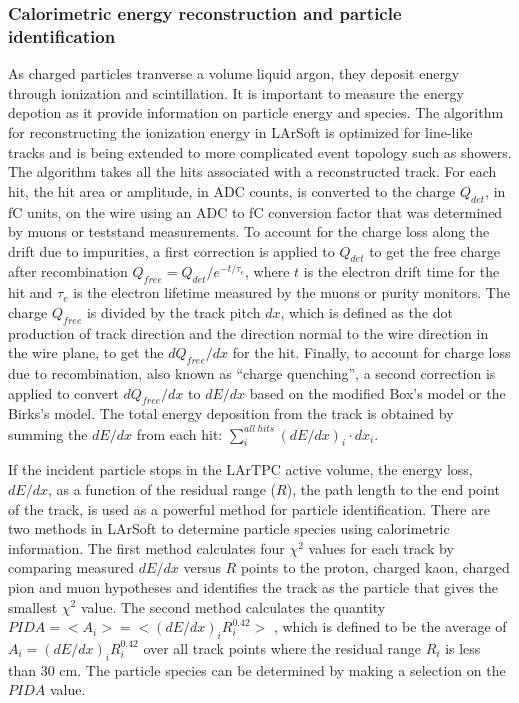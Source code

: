 \documentclass[12pt]{elsarticle}
\begin{document}
\subsubsection{Calorimetric energy reconstruction and particle identification}
As charged particles tranverse a volume liquid argon, they deposit energy through ionization and scintillation. It is important to measure the energy depotion as it provide information on particle energy and species. The algorithm for reconstructing the ionization energy in LArSoft is optimized for line-like tracks and is being extended to more complicated event topology such as showers. The algorithm takes all the hits associated with a reconstructed track. For each hit, the hit area or amplitude, in ADC counts, is converted to the charge $Q_{det}$, in fC units, on the wire using an ADC to fC conversion factor that was determined by muons or teststand measurements. To account for the charge loss along the drift due to impurities, a first correction is applied to $Q_{det}$ to get the free charge after recombination $Q_{free} = Q_{det}/e^{-t/\tau_{e}}$, where $t$ is the electron drift time for the hit and $\tau_{e}$ is the electron lifetime measured by the muons or purity monitors. The charge $Q_{free}$ is divided by the track pitch $dx$, which is defined as the dot production of track direction and the direction normal to the wire direction in the wire plane, to get the $dQ_{free}/dx$ for the hit. Finally, to account for charge loss due to recombination, also known as ``charge quenching'', a second correction is applied to convert $dQ_{free}/dx$ to $dE/dx$ based on the modified Box's model \cite{box} or the Birks's model\cite{birks}. The total energy deposition from the track is obtained by summing the $dE/dx$ from each hit: $\sum\limits_{i}^{all\ hits}(dE/dx)_{i}\cdot dx_{i}$.

If the incident particle stops in the LArTPC active volume, the energy loss, $dE/dx$, as a function of the residual range ($R$), the path length to the end point of the track, is used as a powerful method for particle identification. There are two methods in LArSoft to determine particle species using calorimetric information. The first method calculates four $\chi^{2}$ values for each track by comparing measured $dE/dx$ versus $R$ points to the proton, charged kaon, charged pion and muon hypotheses and identifies the track as the particle that gives the smallest $\chi^{2}$ value. The second method calculates the quantity $PIDA = <A_{i}> = <(dE/dx)_{i}R_{i}^{0.42}>$ \cite{box}, which is defined to be the average of $A_{i} = (dE/dx)_{i}R_{i}^{0.42}$ over all track points where the residual range $R_{i}$ is less than 30 cm. The particle species can be determined by making a selection on the $PIDA$ value. 
\end{document}
